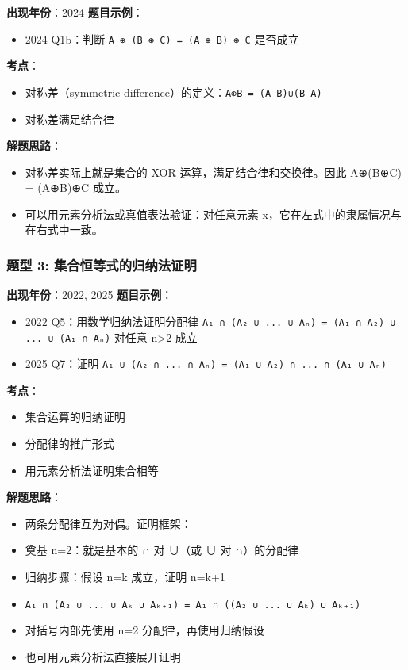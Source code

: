 \documentclass[10pt,a4paper,openany]{ctexbook}
\theoremstyle{definition}
\theoremstyle{remark}
\begin{document}
\textbf{出现年份}：2024
\textbf{题目示例}：
\begin{itemize}
\item 2024 Q1b：判断 \texttt{A ⊕ (B ⊕ C) = (A ⊕ B) ⊕ C} 是否成立

\end{itemize}

\textbf{考点}：
\begin{itemize}
\item 对称差（symmetric difference）的定义：\texttt{A⊕B = (A-B)∪(B-A)}
\item 对称差满足结合律

\end{itemize}

\textbf{解题思路}：
\begin{itemize}
\item 对称差实际上就是集合的 XOR 运算，满足结合律和交换律。因此 A⊕(B⊕C) = (A⊕B)⊕C 成立。
\item 可以用元素分析法或真值表法验证：对任意元素 x，它在左式中的隶属情况与在右式中一致。

\end{itemize}

\vspace{-2pt}

\subsubsection{题型 3: 集合恒等式的归纳法证明}

\textbf{出现年份}：2022, 2025
\textbf{题目示例}：
\begin{itemize}
\item 2022 Q5：用数学归纳法证明分配律 \texttt{A₁ ∩ (A₂ ∪ ... ∪ Aₙ) = (A₁ ∩ A₂) ∪ ... ∪ (A₁ ∩ Aₙ)} 对任意 n>2 成立
\item 2025 Q7：证明 \texttt{A₁ ∪ (A₂ ∩ ... ∩ Aₙ) = (A₁ ∪ A₂) ∩ ... ∩ (A₁ ∪ Aₙ)}

\end{itemize}

\textbf{考点}：
\begin{itemize}
\item 集合运算的归纳证明
\item 分配律的推广形式
\item 用元素分析法证明集合相等

\end{itemize}

\textbf{解题思路}：
\begin{itemize}
\item 两条分配律互为对偶。证明框架：
\item 奠基 n=2：就是基本的 ∩ 对 ∪（或 ∪ 对 ∩）的分配律
\item 归纳步骤：假设 n=k 成立，证明 n=k+1
\item \texttt{A₁ ∩ (A₂ ∪ ... ∪ Aₖ ∪ Aₖ₊₁) = A₁ ∩ ((A₂ ∪ ... ∪ Aₖ) ∪ Aₖ₊₁)}
\item 对括号内部先使用 n=2 分配律，再使用归纳假设
\item 也可用元素分析法直接展开证明

\end{itemize}
\end{document}
